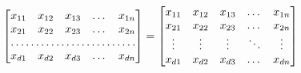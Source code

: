 \documentclass[a4paper,10pt]{article}
\begin{document}
\[
\begin{bmatrix}
    x_{11}       & x_{12} & x_{13} & \dots & x_{1n} \\
    x_{21}       & x_{22} & x_{23} & \dots & x_{2n} \\
    \hdotsfor{5} \\
    x_{d1}       & x_{d2} & x_{d3} & \dots & x_{dn}
\end{bmatrix}
=
\begin{bmatrix}
    x_{11} & x_{12} & x_{13} & \dots  & x_{1n} \\
    x_{21} & x_{22} & x_{23} & \dots  & x_{2n} \\
    \vdots & \vdots & \vdots & \ddots & \vdots \\
    x_{d1} & x_{d2} & x_{d3} & \dots  & x_{dn}
\end{bmatrix}
\]
\end{document}

